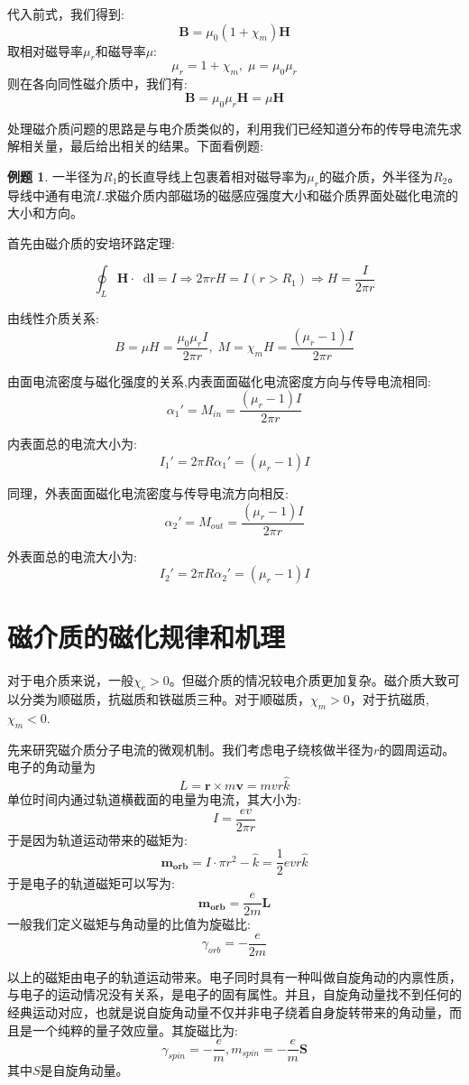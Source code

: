 \documentclass[12pt,a4paper,oneside]{report}
\theoremstyle{definition}
\newtheorem{example}{例题}[chapter]
\theoremstyle{remark}
\newcommand{\mb}[1]{\mathbf{#1}}
\renewcommand{\d}{\mathop{}\!\mathrm{d}}
\begin{document}
代入前式，我们得到:
\[
\mathbf{B} = \mu_0(1+\chi_m)\mathbf{H}
\]
取相对磁导率$\mu_r$和磁导率$\mu$:
\[
\mu_r = 1+\chi_m,\; \mu = \mu_0 \mu_r
\]
则在各向同性磁介质中，我们有:
\[
\mathbf{B} = \mu_0\mu_r \mathbf{H} = \mu \mathbf{H}
\]

处理磁介质问题的思路是与电介质类似的，利用我们已经知道分布的传导电流先求解相关量，最后给出相关的结果。下面看例题:
\begin{example}
  
一半径为$R_1$的长直导线上包裹着相对磁导率为$\mu_r$的磁介质，外半径为$R_2$。导线中通有电流$I$.求磁介质内部磁场的磁感应强度大小和磁介质界面处磁化电流的大小和方向。

首先由磁介质的安培环路定理:

\[
\oint_L \mathbf{H}\cdot \d \mb{l} = I \Rightarrow 2\pi r H = I (r>R_1) \Rightarrow H = \frac{I}{2\pi r} 
\]

由线性介质关系:
\[
B = \mu H = \frac{\mu_0\mu_r I}{2\pi r}, \; M = \chi_m H =\frac{(\mu_r-1) I}{2\pi r}
\]

由面电流密度与磁化强度的关系,内表面面磁化电流密度方向与传导电流相同:
\[
\alpha_1' = M_{in}  = \frac{(\mu_r-1) I}{2\pi r}
\]

内表面总的电流大小为:
\[
I_1' = 2\pi R\alpha_1' = (\mu_r-1) I
\]

同理，外表面面磁化电流密度与传导电流方向相反:
\[
\alpha_2' = M_{out}  = \frac{(\mu_r-1) I}{2\pi r}
\]

外表面总的电流大小为:
\[
I_2' = 2\pi R\alpha_2' = (\mu_r-1) I
\]
\end{example}


\section{磁介质的磁化规律和机理}
对于电介质来说，一般$\chi_e>0$。但磁介质的情况较电介质更加复杂。磁介质大致可以分类为顺磁质，抗磁质和铁磁质三种。对于顺磁质，$\chi_m>0$，对于抗磁质,$\chi_m<0$.

先来研究磁介质分子电流的微观机制。我们考虑电子绕核做半径为$r$的圆周运动。电子的角动量为
\[
L=\mathbf{r}\times m\mathbf{v}=mvr\hat{k}
\]
单位时间内通过轨道横截面的电量为电流，其大小为:
\[
I=\frac{ev}{2\pi r}
\]
于是因为轨道运动带来的磁矩为:
\[
\mathbf{m_{orb}} = I \cdot \pi r^2 -\hat{k} = \frac{1}{2}evr\hat{k}
\]
于是电子的轨道磁矩可以写为:
\[
\mathbf{m_{orb}}=\frac{e}{2m}\mathbf{L}
\]
一般我们定义磁矩与角动量的比值为旋磁比:
\[
\gamma_{orb}=-\frac{e}{2m}
\]

以上的磁矩由电子的轨道运动带来。电子同时具有一种叫做自旋角动的内禀性质，与电子的运动情况没有关系，是电子的固有属性。并且，自旋角动量找不到任何的经典运动对应，也就是说自旋角动量不仅并非电子绕着自身旋转带来的角动量，而且是一个纯粹的量子效应量。其旋磁比为:
\[
\gamma_{spin} = -\frac{e}{m}, m_{spin} = -\frac{e}{m}\mathbf{S}
\]
其中$S$是自旋角动量。
\end{document}
